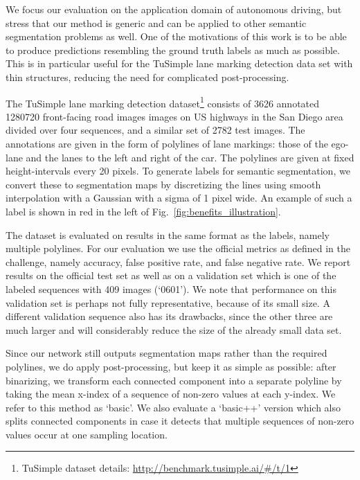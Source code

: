 \documentclass{article} \usepackage{nips13submit_e,times}
\begin{document}
We focus our evaluation on the application domain of autonomous driving, but stress that our method is generic and can be applied to other semantic segmentation problems as well.
One of the motivations of this work is to be able to produce predictions resembling the ground truth labels as much as possible.
This is in particular useful for the TuSimple lane marking detection data set with thin structures, reducing the need for complicated post-processing.




The TuSimple lane marking detection dataset\footnote{TuSimple dataset details: \url{http://benchmark.tusimple.ai/\#/t/1}} consists of 3626 annotated 1280720 front-facing road images images on US highways in the San Diego area divided over four sequences, and a similar set of 2782 test images.
The annotations are given in the form of polylines of lane markings: those of the ego-lane and the lanes to the left and right of the car.
The polylines are given at fixed height-intervals every 20 pixels.
To generate labels for semantic segmentation, we convert these to segmentation maps by discretizing the lines using smooth interpolation with a Gaussian with a sigma of 1 pixel wide.
An example of such a label is shown in red in the left of Fig.~\ref{fig:benefits_illustration}.

The dataset is evaluated on results in the same format as the labels, namely multiple polylines.
For our evaluation we use the official metrics as defined in the challenge, namely accuracy, false positive rate, and false negative rate.
We report results on the official test set as well as on a validation set which is one of the labeled sequences with 409 images (`0601').
We note that performance on this validation set is perhaps not fully representative, because of its small size.
A different validation sequence also has its drawbacks, since the other three are much larger and will considerably reduce the size of the already small data set.


Since our network still outputs segmentation maps rather than the required polylines, we do apply post-processing, but keep it as simple as possible: after binarizing, we transform each connected component into a separate polyline by taking the mean x-index of a sequence of non-zero values at each y-index.
We refer to this method as `basic'.
We also evaluate a `basic++' version which also splits connected components in case it detects that multiple sequences of non-zero values occur at one sampling location.
\end{document}
